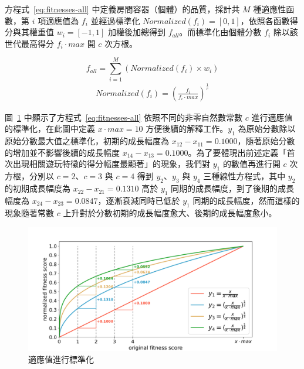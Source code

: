 方程式~\ref{eq:fitnesses-all} 中定義房間容器（個體）的品質，採計共 $M$ 種適應性函數，第 $i$ 項適應值為 $f_{i}$ 並經過標準化 $Normalized(f_{i}) = [0, 1]$，依照各函數得分與其權重值 $w_{i} = [-1, 1]$ 加權後加總得到 $f_{all}$。而標準化由個體分數 $f_{i}$ 除以該世代最高得分 $f_{i}\cdot max$ 開 $c$ 次方根。

\begin{equation}
    \label{eq:fitnesses-all}
    f_{all} = \sum_{i=1}^{M} (Normalized(f_{i}) \times w_{i})
\end{equation}
\begin{gather*}
    Normalized(f_{i}) = (\frac{f_{i}}{f_{i}\cdot max})^{\frac{1}{c}}
\end{gather*}

圖~\ref{fig:fitnesses-normalized} 中顯示了方程式~\ref{eq:fitnesses-all} 依照不同的非零自然數常數 $c$ 進行適應值的標準化，在此圖中定義 $x\cdot max = 10$ 方便後續的解釋工作。$y_{1}$ 為原始分數除以原始分數最大值之標準化，初期的成長幅度為 $x_{12} - x_{11} = 0.1000$，隨著原始分數的增加並不影響後續的成長幅度 $x_{14} - x_{13} = 0.1000$。為了要體現出前述定義「首次出現相關遊玩特徵的得分幅度最顯著」的現象，我們對 $y_{1}$ 的數值再進行開 $c$ 次方根，分別以 $c = 2$、$c = 3$ 與 $c = 4$ 得到 $y_{2}$、$y_{3}$ 與 $y_{4}$ 三種線性方程式，其中 $y_{2}$ 的初期成長幅度為 $x_{22} - x_{21} = 0.1310$ 高於 $y_{1}$ 同期的成長幅度，到了後期的成長幅度為 $x_{24} - x_{23} = 0.0847$，逐漸衰減同時已低於 $y_{1}$ 同期的成長幅度，然而這樣的現象隨著常數 $c$ 上升對於分數初期的成長幅度愈大、後期的成長幅度愈小。

\begin{figure}[ht]
  \begin{center}
    \includegraphics[width=1.0\textwidth]{figures/fitnesses-normalized.pdf}
    \caption{適應值進行標準化}
    \label{fig:fitnesses-normalized}
  \end{center}
\end{figure}


